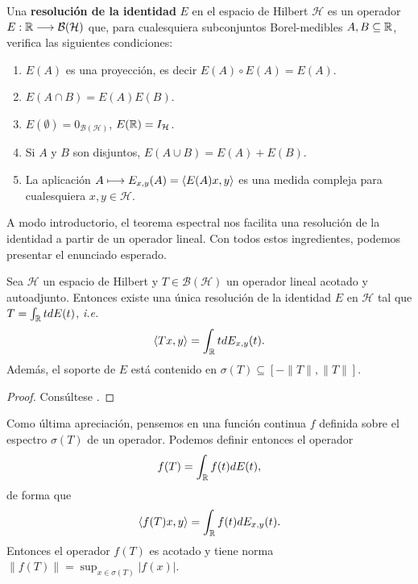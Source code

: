     \begin{definicion}
        \label{def:resolucion-identidad}
        Una \textbf{resolución de la identidad} $E$ en el espacio de Hilbert $\mathcal{H}$ es un operador $E:\mathbb{R}\longrightarrow\mathcal{B}(\mathcal{H})$ que, para cualesquiera subconjuntos Borel-medibles $A,B\subseteq \mathbb{R}$, verifica las siguientes condiciones:
        \begin{enumerate}
            \item $E(A)$ es una proyección, es decir $E(A)\circ E(A)=E(A)$.
            \item $E(A\cap B)=E(A)E(B)$.
            \item $E(\emptyset)=0_{\mathcal{B}(\mathcal{H})}$, $E(\mathbb{R})=I_\mathcal{H}$.
            \item Si $A$ y $B$ son disjuntos, $E(A\cup B)=E(A)+E(B)$.
            \item La aplicación $A\longmapsto E_{x,y}(A)=\left\langle E(A)x , y \right\rangle$ es una medida compleja para cualesquiera $x,y\in\mathcal{H}$.
        \end{enumerate}
    \end{definicion}

    A modo introductorio, el teorema espectral nos facilita una resolución de la identidad a partir de un operador lineal. Con todos estos ingredientes, podemos presentar el enunciado esperado.

    \begin{teorema}
        \label{th:espectral}

        Sea $\mathcal{H}$ un espacio de Hilbert y $T\in\mathcal{B}(\mathcal{H})$ un operador lineal acotado y autoadjunto. Entonces existe una única resolución de la identidad $E$ en $\mathcal{H}$ tal que $T=\int_{\mathbb{R}} t dE(t)$, \textit{i.e.}
        \begin{equation}
            \label{eq:teorema-espectral}
            \left\langle Tx , y \right\rangle = \int_{\mathbb{R}} t dE_{x,y}(t).
        \end{equation}
        Además, el soporte de $E$ está contenido en $\sigma(T)\subseteq[-\|T\|,\|T\|]$.
    \end{teorema}
    \begin{proof}
        Consúltese \cite[Theorem 12.22]{rudin}.
    \end{proof}

    Como última apreciación, pensemos en una función continua $f$ definida sobre el espectro $\sigma(T)$ de un operador. Podemos definir entonces el operador
    $$
    f(T)=\int_{\mathbb{R}} f(t) dE(t),
    $$
    de forma que
    $$
    \left\langle f(T)x , y \right\rangle=\int_{\mathbb{R}} f(t)d E_{x,y}(t).
    $$
    Entonces el operador $f(T)$ es acotado y tiene norma $\|f(T)\|=\displaystyle\sup_{x\in\sigma(T)}|f(x)|$.

    